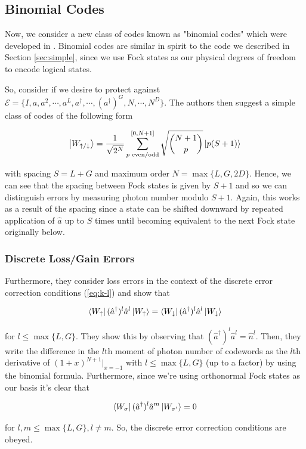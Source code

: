 \documentclass[12]{amsart}
\newcommand\0{\mathbf{0}}
\newcommand\<{\langle}
\renewcommand\>{\rangle}
\begin{document}
\subsection{Binomial Codes}

Now, we consider a new class of codes known as "binomial codes" which were developed in  \cite{michael2016new}. Binomial codes are similar in spirit to the code we described in Section \ref{sec:simple}, since we use Fock states as our physical degrees of freedom to encode logical states.


So, consider if we desire to protect against $\mathcal{E} = \{I, a, a^2, \cdots, a^L, a^\dag, \cdots, (a^\dag)^G, N, \cdots, N^D \}$. The authors then suggest a simple class of codes of the following form

$$
\ket{W_{\uparrow / \downarrow}} = \frac{1}{\sqrt{2^N}} \sum_{ p\text{ even/odd}}^{[0, N+1]} \sqrt{\binom{N+1}{ p }} \ket{p(S+1)}
$$

with spacing $S = L+G$ and maximum order $N = \max\{L, G, 2D\}$. Hence, we can see that the spacing between Fock states is given by $S+1$ and so we can distinguish errors by measuring photon number modulo $S+1$. Again, this works as a result of the spacing since a state can be shifted downward by repeated application of $\hat{a}$ up to $S$ times until becoming equivalent to the next Fock state originally below.

\subsubsection{Discrete Loss/Gain Errors}

 Furthermore, they consider loss errors in the context of the discrete error correction conditions (\ref{eq:k-l}) and show that

$$
\bra{W_\uparrow}(\hat{a}^\dag)^l\hat{a}^l \ket{W_{\uparrow}} = \bra{W_\downarrow}(\hat{a}^\dag)^l\hat{a}^l \ket{W_{\downarrow}}
$$ 

for $l \leq \max\{L, G\}$. They show this by observing that $(\hat{a}^\dag)^l\hat{a}^l = \hat{n}^l$. Then, they write the difference in the $l$th moment of photon number of codewords as the $l$th derivative of $(1+x)^{N+1}\vert_{x=-1}$ with $l \leq \max\{L, G\}$ (up to a factor) by using the binomial formula. Furthermore, since we're using orthonormal Fock states as our basis it's clear that

$$
\bra{W_\sigma}(\hat{a}^\dag)^l\hat{a}^m \ket{W_{\sigma'}} = 0
$$  

for $l, m \leq \max\{L, G\}, l \neq m$. So, the discrete error correction conditions are obeyed.
\end{document}
